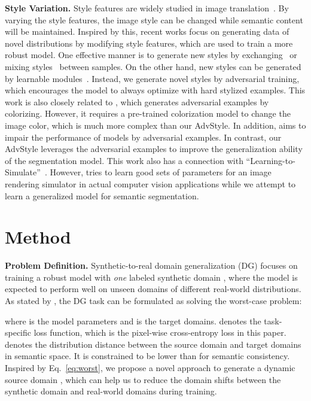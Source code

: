 \documentclass{article}
\begin{document}
\textbf{Style Variation.}
Style features are widely studied in image translation~\cite{adain, dumoulin2016learned}. By varying the style features, the image style can be changed while semantic content will be maintained.
Inspired by this, recent works focus on generating data of novel distributions by modifying style features, which are used to train a more robust model.
One effective manner is to generate new styles by 
exchanging~\cite{crossnorm,zhao2021source} or mixing styles~\cite{zhou2021mixstyle} between samples. 
On the other hand, new styles can be generated by learnable modules~\cite{wang2021L2D}. Instead, we generate novel styles by adversarial training, which encourages the model to always optimize with hard stylized examples. {This work is also closely related to \cite{bhattad2020unrestricted}, which generates adversarial examples by colorizing. However, it requires a pre-trained colorization model to change the image color, which is much more complex than our AdvStyle. In addition, \cite{bhattad2020unrestricted} aims to impair the performance of models by adversarial examples. In contrast, our AdvStyle leverages the adversarial examples to improve the generalization ability of the segmentation model. This work also has a connection with ``Learning-to-Simulate''~\cite{ruiz2019learning2simulate}. However, \cite{ruiz2019learning2simulate} tries to learn good sets of parameters for an image rendering simulator in actual computer vision applications while we attempt to learn a generalized model for semantic segmentation.}

\section{Method}
\label{sec:method}
\textbf{Problem Definition.} Synthetic-to-real domain generalization (DG) focuses on training a robust model with \textit{one} labeled synthetic domain , where the model is expected to perform well on  unseen domains  of different real-world distributions. As stated by \cite{volpi2018generalizing}, the DG task can be formulated as solving the worst-case problem:

where  is the model parameters and  is the target domains.  denotes the task-specific loss function, which is the pixel-wise cross-entropy loss in this paper.  denotes the distribution distance between the source domain and target domains in semantic space. It is constrained to be lower than  for semantic consistency.
Inspired by Eq.~\ref{eq:worst}, we propose a novel approach to generate a dynamic source domain , which can help us to reduce the domain shifts between the synthetic domain  and real-world domains  during training.
\end{document}

